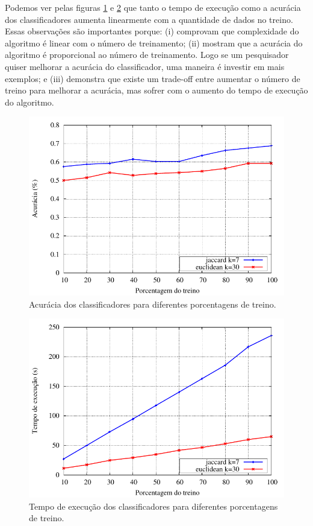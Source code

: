 \documentclass[a4paper, 11 pt, onecolumn]{article}   %
\begin{document}
Podemos ver pelas figuras \ref{fig:entrada} e \ref{fig:entrada2} que tanto o tempo de execução como a acurácia dos classificadores aumenta linearmente com a quantidade de dados no treino. Essas observações são importantes porque: (i) comprovam que complexidade do algoritmo é linear com o número de treinamento; (ii) mostram que a acurácia do algoritmo é proporcional ao número de treinamento. Logo se um pesquisador quiser melhorar a acurácia do classificador, uma maneira é investir em mais exemplos; e (iii) demonstra que existe um trade-off entre aumentar o número de treino para melhorar a acurácia, mas sofrer com o aumento do tempo de execução do algoritmo.

\begin{figure}
 \includegraphics{imagens/entrada.pdf}
 \caption{\label{fig:entrada} Acurácia dos classificadores para diferentes porcentagens de treino.}
\end{figure}

\begin{figure}
 \includegraphics{imagens/entrada2.pdf}
 \caption{\label{fig:entrada2} Tempo de execução dos classificadores para diferentes porcentagens de treino.}
\end{figure}
\end{document}
